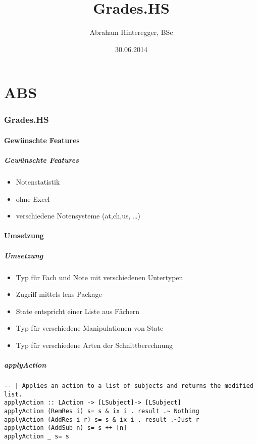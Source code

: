 \documentclass{beamer}
\begin{document}
\part{ABS}
\title{Grades.HS}
\author{Abraham Hinteregger, BSc}
\date{30.06.2014}
\titlepage
\setcounter{tocdepth}{4}




\section{Grades.HS} 
\subsection{Gewünschte Features}
\begin{frame}[fragile]
\frametitle{Gewünschte Features} 
\begin{itemize}
\item Notenstatistik
\item ohne Excel
\item verschiedene Notensysteme (at,ch,us, \ldots)
\end{itemize}
\end{frame}

\subsection{Umsetzung}
\begin{frame}[fragile]\frametitle{Umsetzung}

\begin{itemize}
\item Typ für Fach und Note mit verschiedenen Untertypen
\item Zugriff mittels lens Package
\item State entspricht einer Liste aus Fächern
\item Typ für verschiedene Manipulationen von State
\item Typ für verschiedene Arten der Schnittberechnung
\end{itemize}
\end{frame}


\begin{frame}[fragile]
\frametitle{applyAction }
\begin{lstlisting}[language=HaskellUlisses]
-- | Applies an action to a list of subjects and returns the modified list.
applyAction :: LAction -> [LSubject]-> [LSubject]
applyAction (RemRes i) s= s & ix i . result .~ Nothing
applyAction (AddRes i r) s= s & ix i . result .~Just r
applyAction (AddSub n) s= s ++ [n]
applyAction _ s= s
\end{lstlisting}
\end{frame}
\end{document}
